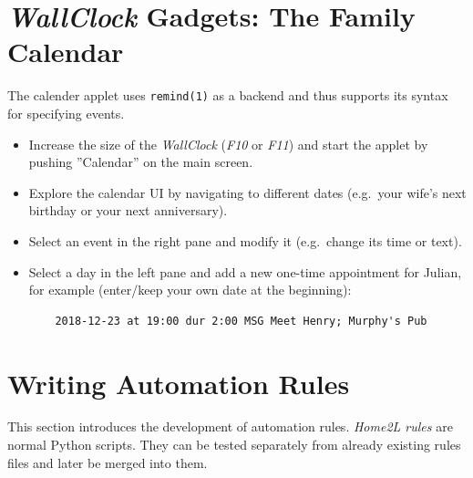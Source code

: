 \documentclass[12pt,english,parskip=half]{scrreprt}
\begin{document}
\section{\emph{WallClock} Gadgets: The Family Calendar}
\label{sec:tutorial-calendar}


The calender applet uses \texttt{remind(1)} as a backend and thus
supports its syntax for specifying events.

\begin{itemize}[$\blacktriangleright$]
\item
  Increase the size of the \emph{WallClock} (\emph{F10} or \emph{F11})
  and start the applet by pushing ''Calendar'' on the main screen.
\item
  Explore the calendar UI by navigating to different dates (e.g.~your wife's
  next birthday or your next anniversary).
\item
  Select an event in the right pane and modify it (e.g.~change its time
  or text).
\item
  Select a day in the left pane and add a new one-time appointment for
  Julian, for example (enter/keep your own date at the beginning):
  \begin{lstlisting}
    2018-12-23 at 19:00 dur 2:00 MSG Meet Henry; Murphy's Pub
  \end{lstlisting}
\end{itemize}





\section{Writing Automation Rules}
\label{sec:tutorial-rules}


This section introduces the development of automation rules. \emph{Home2L rules}
are normal Python scripts. They can be tested separately from already
existing rules files and later be merged into them.
\end{document}

